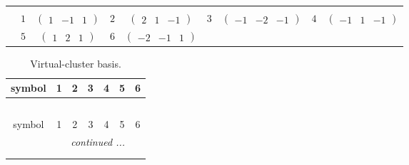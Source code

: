 \documentclass[fleqn,10pt,landscape]{article}
\begin{document}
\begin{itemize}
{\begin{center}
\begin{longtable}{ccccccccc}
 \hline \hline
\multicolumn{8}{r}{} \\ \endlastfoot

 & $ 1 $ & $ \begin{pmatrix} 1 & -1 & 1 \end{pmatrix} $ & $ 2 $ & $ \begin{pmatrix} 2 & 1 & -1 \end{pmatrix} $ & $ 3 $ & $ \begin{pmatrix} -1 & -2 & -1 \end{pmatrix} $ & $ 4 $ & $ \begin{pmatrix} -1 & 1 & -1 \end{pmatrix} $ \\
& $ 5 $ & $ \begin{pmatrix} 1 & 2 & 1 \end{pmatrix} $ & $ 6 $ & $ \begin{pmatrix} -2 & -1 & 1 \end{pmatrix} $ & $  $ & $  $ & $  $ & $  $ \\
\end{longtable}
\end{center}
\begin{center}
\renewcommand{\arraystretch}{1.7}
\begin{longtable}{ccccccc}
\caption{Virtual-cluster basis.}
 \\
 \hline \hline
symbol & 1 & 2 & 3 & 4 & 5 & 6 \\ \hline \endfirsthead

\multicolumn{6}{l}{\tablename\ \thetable{}} \\
 \hline \hline
symbol & 1 & 2 & 3 & 4 & 5 & 6 \\ \hline \endhead

 \hline \hline
\multicolumn{6}{r}{\footnotesize\it continued ...} \\ \endfoot

 \hline \hline
\multicolumn{6}{r}{} \\ \endlastfoot


\end{longtable}
\end{center}}
\end{itemize}
\end{document}
